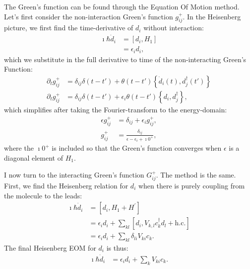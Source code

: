 The Green's function can be found through the Equation Of Motion method. Let's first consider the non-interaction Green's function $g_{ij}^+$. In the Heisenberg picture, we first find the time-derivative of $d_i$ without interaction:
\begin{align*}
\imath \hbar \dot{d}_i &= \left[d_i, H_1\right] \\
&= \epsilon_i d_i,
\end{align*} which we substitute in the full derivative to time of the non-interacting Green's Function: \begin{align*}
\partial_t g_{ij}^+ &= \delta_{ij} \delta(t-t') + \theta(t-t')\left\{ \dot{d}_i(t), d_j^\dagger(t')\right\} \\
\partial_t g_{ij}^+&= \delta_{ij} \delta(t-t') +\epsilon_i \theta(t-t')\left\{ d_i, d_j^\dagger\right\},
\end{align*} which simplifies after taking the Fourier-transform to the energy-domain:
\begin{align*}
\epsilon g_{ij}^+ &= \delta_{ij} + \epsilon_i g_{ij}^+, \\
g_{ij}^+ &= \frac{ \delta_{ij} }{ \epsilon - \epsilon_i + \imath 0^+},
\end{align*}
where the $\imath 0^+$ is included so that the Green's function converges when $\epsilon$ is a diagonal element of $H_1$.

I now turn to the interacting Green's function $G_{ij}^+$. The method is the same.
First, we find the Heisenberg relation for $d_i$ when there is purely coupling from the molecule to the leads:
\begin{align*}
\imath \hbar \dot{d}_i &= \left[ d_i, H_1 + H^\prime\right] \\
&=\epsilon_i d_i + \sum_{kl}\left[d_i, V_{k, l} c^\dagger_{k} d_l + \text{h.c.}\right] \\
&=\epsilon_i d_i + \sum_{kl}\delta_{li} V_{ki} c_{k}.
\end{align*}
The final Heisenberg EOM for $d_i$ is thus:
\begin{align}
\imath \hbar \dot{d}_i &= \epsilon_i d_i + \sum_{k}V_{ki} c_{k} \label{eq:heisenbergdotd}.
\end{align}

